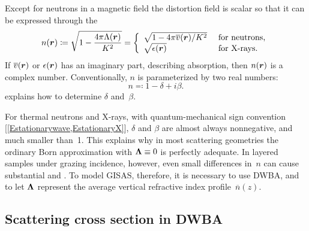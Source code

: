 Except for neutrons in a magnetic field
the distortion field is scalar so
that it can be expressed through the 
%
%
%
\begin{equation}\label{EnkK}
  n(\r)
  \coloneqq\sqrt{1-\frac{4\pi\Lambda(\r)}{K^2}}
  = \left\{\begin{array}{ll}
       \sqrt{1-4\pi\mv(\r)/K^2} &\text{ for neutrons,}\\
       \sqrt{\epsilon(\r)} &\text{ for X-rays.}
    \end{array}\right.
\end{equation}
If $\overline{v}(\bm{r})$ or $\epsilon(\bm{r})$ has an imaginary part, describing absorption,
%
then $n(\bm{r})$ is a complex number.
Conventionally, $n$ is parameterized by two real numbers:
\begin{equation}\label{Endb1}
  n \eqqcolon  1-\delta +i\beta.
\end{equation}
%
%
 explains how to determine $\delta$ and~$\beta$.

For thermal neutrons and X-rays,
with quantum-mechanical sign convention [\cref{Estationarywave,EstationaryX}],
$\delta$ and $\beta$ are almost always nonnegative,
%
%
and much smaller than~1.
This explains why in most scattering geometries
%
the ordinary Born approximation
%
with $\bm{\Lambda}\equiv0$ is perfectly adequate.
In layered samples under grazing incidence,
%
however, even small differences in~$n$ can cause substantial
 and .
%
%
To model GISAS, therefore,
it is necessary to use DWBA,
%
and to let $\bm{\Lambda}$ represent
the average vertical refractive index profile~$\overline{n}(z)$.
%

\subsection{Scattering cross section in DWBA}\label{SxDWBA}

